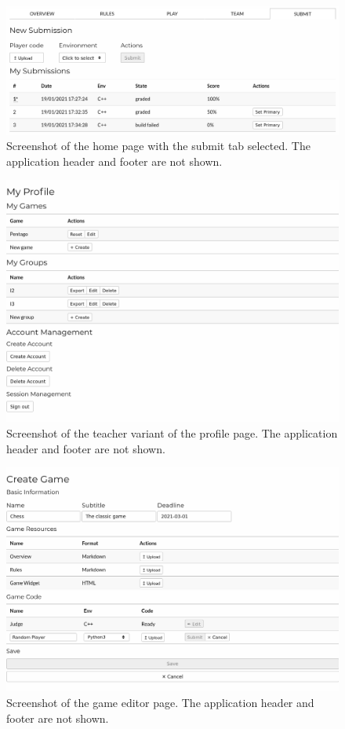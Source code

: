 \begin{figure}[t]
    \centering\includegraphics[width=\textwidth]{figures/www_submit.png}
	\caption{Screenshot of the home page with the submit tab selected. The application header and footer are not shown.}\label{fig:gui_submit}
\end{figure}

\begin{figure}[t]
    \centering\includegraphics[width=\textwidth]{figures/www_profile.png}
	\caption{Screenshot of the teacher variant of the profile page. The application header and footer are not shown.}\label{fig:gui_profile}
\end{figure}

\begin{figure}[t]
    \centering\includegraphics[width=\textwidth]{figures/www_create.png}
	\caption{Screenshot of the game editor page. The application header and footer are not shown.}\label{fig:gui_create}
\end{figure}

